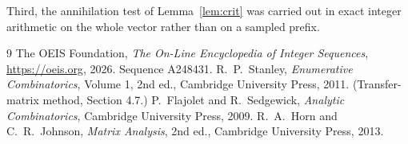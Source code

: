 \documentclass[11pt,a4paper]{article}
\theoremstyle{plain}
\theoremstyle{definition}
\begin{document}
Third, the annihilation test of Lemma~\ref{lem:crit} was carried out in exact integer
arithmetic on the whole vector rather than on a sampled prefix.

\begin{thebibliography}{9}
 The OEIS Foundation, \emph{The On-Line Encyclopedia of Integer
Sequences}, \url{https://oeis.org}, 2026. Sequence A248431.
 R.~P.~Stanley, \emph{Enumerative Combinatorics}, Volume 1, 2nd ed.,
Cambridge University Press, 2011. (Transfer-matrix method, Section 4.7.)
 P.~Flajolet and R.~Sedgewick, \emph{Analytic Combinatorics}, Cambridge
University Press, 2009.
 R.~A.~Horn and C.~R.~Johnson, \emph{Matrix Analysis}, 2nd ed., Cambridge
University Press, 2013.
\end{thebibliography}
\end{document}
